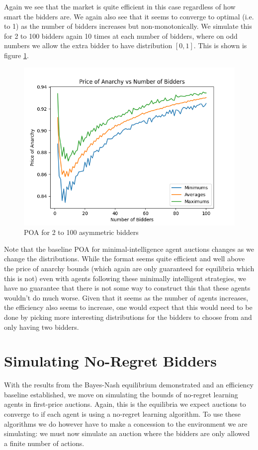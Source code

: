 \documentclass[12pt,twoside]{reedthesis}
\begin{document}
Again we see that the market is quite efficient in this case regardless of how smart the bidders are. We again also see that it seems to converge to optimal (i.e. to 1) as the number of bidders increases but non-monotonically. We simulate this for 2 to 100 bidders again 10 times at each number of bidders, where on odd numbers we allow the extra bidder to have distribution $[0,1]$. This is shown is figure \ref{figure:zi_assymetric}.

\begin{figure}[h!]
	\centering
	\includegraphics[scale=0.8]{Figures/zi_asymmetric}
	\caption{POA for 2 to 100 asymmetric bidders}
	\label{figure:zi_assymetric}
\end{figure}

Note that the baseline POA for minimal-intelligence agent auctions changes as we change the distributions. While the format seems quite efficient and well above the price of anarchy bounds (which again are only guaranteed for equilibria which this is not) even with agents following these minimally intelligent strategies, we have no guarantee that there is not some way to construct this that these agents wouldn't do much worse. Given that it seems as the number of agents increases, the efficiency also seems to increase, one would expect that this would need to be done by picking more interesting distributions for the bidders to choose from and only having two bidders.

\section{Simulating No-Regret Bidders}
With the results from the Bayes-Nash equilibrium demonstrated and an efficiency baseline established, we move on simulating the bounds of no-regret learning agents in first-price auctions. Again, this is the equilibria we expect auctions to converge to if each agent is using a no-regret learning algorithm. To use these algorithms we do however have to make a concession to the environment we are simulating: we must now simulate an auction where the bidders are only allowed a finite number of actions.
\end{document}

